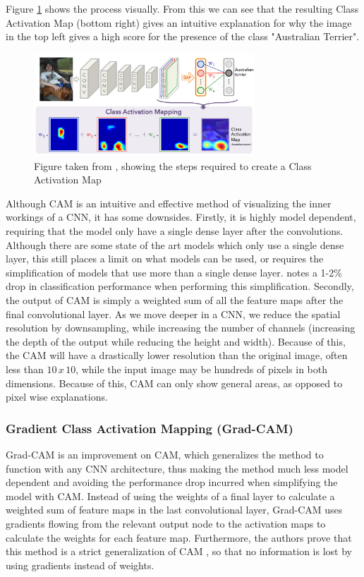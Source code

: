 \documentclass[UKenglish]{uiomasterthesis} %
\theoremstyle{definition}
\begin{document}
Figure \ref{camimg} shows the process visually. From this we can see that the resulting Class Activation Map (bottom right) gives an intuitive explanation for why the image in the top left gives a high score for the presence of the class "Australian Terrier".

\begin{figure}[h]
\centerline{\includegraphics[width=3.25in]{figure/cam.pdf}}
\caption{Figure taken from \cite{cam}, showing the steps required to create a Class Activation Map}
\label{camimg}
\end{figure}

Although CAM is an intuitive and effective method of visualizing the inner workings of a CNN, it has some downsides. Firstly, it is highly model dependent, requiring that the model only have a single dense layer after the convolutions. Although there are some state of the art models which only use a single dense layer, this still places a limit on what models can be used, or requires the simplification of models that use more than a single dense layer. \cite[4]{cam} notes a 1-2\% drop in classification performance when performing this simplification. Secondly, the output of CAM is simply a weighted sum of all the feature maps after the final convolutional layer. As we move deeper in a CNN, we reduce the spatial resolution by downsampling, while increasing the number of channels (increasing the depth of the output while reducing the height and width). Because of this, the CAM will have a drastically lower resolution than the original image, often less than $10 \, x \, 10$, while the input image may be hundreds of pixels in both dimensions. Because of this, CAM can only show general areas, as opposed to pixel wise explanations.
\\

\subsubsection{Gradient Class Activation Mapping (Grad-CAM)}

Grad-CAM \cite{gradcam} is an improvement on CAM, which generalizes the method to function with any CNN architecture, thus making the method much less model dependent and avoiding the performance drop incurred when simplifying the model with CAM. Instead of using the weights of a final layer to calculate a weighted sum of feature maps in the last convolutional layer, Grad-CAM uses gradients flowing from the relevant output node to the activation maps to calculate the weights for each feature map. Furthermore, the authors prove that this method is a strict generalization of CAM \cite[5]{gradcam}, so that no information is lost by using gradients instead of weights.
\end{document}
